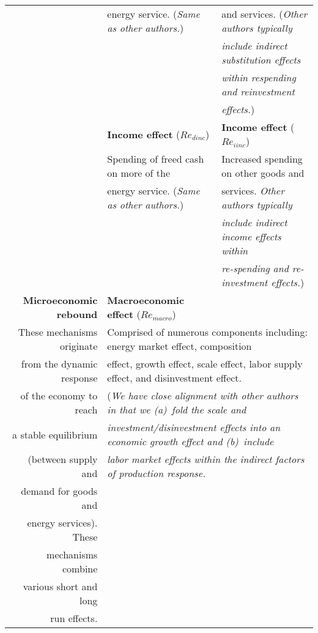 \begin{table}
\begin{center}
\begin{tabular}{ r l l }
                                   & energy service. (\emph{Same as other authors.})    & and services. (\emph{Other authors typically} \\
                                   &                                             & \emph{include indirect substitution effects} \\
                                   &                                             & \emph{within respending and reinvestment} \\ 
                                   &                                             & \emph{effects.}) \\ 
                                   \cmidrule{2-3}
                                   & \textbf{Income effect} ($Re_{dinc}$)        & \textbf{Income effect} ($Re_{iinc}$) \\
                                   & Spending of freed cash on more of the       & Increased spending on other goods and \\
                                   & energy service. (\emph{Same as other authors.}) & services. \emph{Other authors typically} \\
                                   &                                             & \emph{include indirect income effects within} \\ 
                                   &                                             & \emph{re-spending and re-investment effects.}) \\
\midrule
\textbf{Microeconomic rebound}     & \textbf{Macroeconomic effect} ($Re_{macro}$)  & \\
These mechanisms originate         & \multicolumn{2}{l}{Comprised of numerous components including: energy market effect, composition} \\
from the dynamic response          & \multicolumn{2}{l}{effect, growth effect, scale effect, labor supply effect, and disinvestment effect.} \\
of the economy to reach            & \multicolumn{2}{l}{(\emph{We have close alignment with other authors in that we (a)~fold the scale and}} \\
a stable equilibrium               & \multicolumn{2}{l}{\emph{investment/disinvestment effects into an economic growth effect and (b)~include}} \\
(between supply and                & \multicolumn{2}{l}{\emph{labor market effects within the indirect factors of production response.}} \\
demand for goods and               & & \\
energy services). These            & & \\
mechanisms combine                 & & \\
various short and long             & & \\
run effects.                       & & \\
\bottomrule
\end{tabular}
\end{center}
\end{table}



